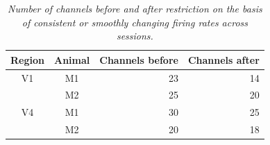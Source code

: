 \begin{table}[bthp]
\begin{center}
\begin{tabular}{ccrr}
\toprule
Region  & Animal    & Channels before   & Channels after \\
\midrule
V1      & M1        & 23                & 14 \\
        & M2        & 25                & 20 \\
V4      & M1        & 30                & 25 \\
        & M2        & 20                & 18 \\
\bottomrule
\end{tabular}
\end{center}
\caption{
\textit{Number of channels before and after restriction on the basis of consistent or smoothly changing firing rates across sessions.}
}
\label{tab:nchannels_restricted}
\end{table}


